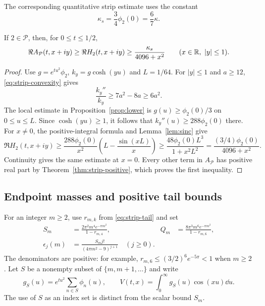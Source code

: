 The corresponding quantitative strip estimate uses the constant
\begin{equation}\label{eq:kappa-strip}
 \kappa_s=\frac34\phi_2(0)=\frac67\kappa.
\end{equation}

\begin{proposition}\label{prop:strip-lower}
If $2\in\mathcal P$, then, for $0\le t\le1/2$,
\begin{equation}\label{eq:strip-lower}
 \Re A_{\mathcal P}(t,x+iy)
 \ge\Re H_2(t,x+iy)
 \ge\frac{\kappa_s}{4096+x^2}
 \qquad(x\in\mathbb R,\ |y|\le1).
\end{equation}
\end{proposition}
\begin{proof}
Use $g=e^{tu^2}\phi_2$, $k_y=g\cosh(yu)$ and $L=1/64$.
For $|y|\le1$ and $a\ge12$, \eqref{eq:strip-convexity} gives
\[
 \frac{k_y''}{k_y}\ge7a^2-8a\ge6a^2.
\]
The local estimate in Proposition~\ref{prop:lower} is
$g(u)\ge\phi_2(0)/3$ on $0\le u\le L$. Since $\cosh(yu)\ge1$,
it follows that $k_y''(u)\ge288\phi_2(0)$ there. For $x\ne0$,
the positive-integral formula and Lemma~\ref{lem:sinc} give
\[
 \Re H_2(t,x+iy)
 \ge\frac{288\phi_2(0)}{x^2}
       \left(L-\frac{\sin(xL)}x\right)
 \ge\frac{48\phi_2(0)L^3}{1+x^2L^2}
 =\frac{(3/4)\phi_2(0)}{4096+x^2}.
\]
Continuity gives the same estimate at $x=0$. Every other term in
$A_{\mathcal P}$ has positive real part by
Theorem~\ref{thm:strip-positive}, which proves the first inequality.
\end{proof}

\subsection{Endpoint masses and positive tail bounds}

For an integer $m\ge2$, use $r_{m,k}$ from \eqref{eq:strip-tail} and set
\begin{align}
 S_m&=\frac{2\pi^2m^4e^{-\pi m^2}}{1-r_{m,4}},&
 Q_m&=\frac{8\pi^3m^6e^{-\pi m^2}}{1-r_{m,6}},\label{eq:SQ}\\
 \epsilon_j(m)&=\frac{S_m j!}{(4\pi m^2-9)^{j+1}}
 \quad(j\ge0).\label{eq:epsilon}
\end{align}
The denominators are positive: for example,
$r_{m,6}\le(3/2)^6e^{-5\pi}<1$ when $m\ge2$.
Let $S$ be a nonempty subset of $\{m,m+1,\ldots\}$ and write
\[
 g_S(u)=e^{tu^2}\sum_{n\in S}\phi_n(u),\qquad
 V(t,x)=\int_0^\infty g_S(u)\cos(xu)\dd u.
 \]
The use of $S$ as an index set is distinct from the scalar bound $S_m$.

